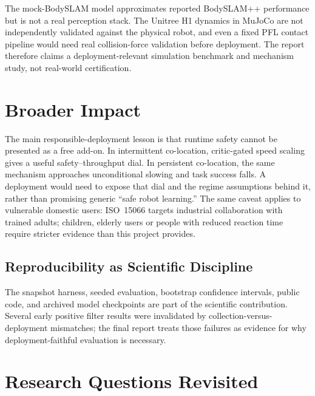 \documentclass[11pt,a4paper]{report}
\newcommand{\pfl}{PFL}
\newcommand{\iso}{ISO~15066}
\newcommand{\bodyslampp}{BodySLAM\nolinebreak[4]\hspace{-.05em}\raisebox{.2ex}{\scriptsize ++}}
\begin{document}
The mock-\bodyslampp{} model approximates reported BodySLAM++
performance but is not a real perception stack. The Unitree H1 dynamics
in MuJoCo are not independently validated against the physical robot,
and even a fixed \pfl{} contact pipeline would need real collision-force
validation before deployment. The report therefore claims a
deployment-relevant simulation benchmark and mechanism study, not
real-world certification.

\section{Broader Impact}
\label{sec:disc:broader}

The main responsible-deployment lesson is that runtime safety cannot be
presented as a free add-on. In intermittent co-location, critic-gated
speed scaling gives a useful safety--throughput dial. In persistent
co-location, the same mechanism approaches unconditional slowing and
task success falls. A deployment would need to expose that dial and the
regime assumptions behind it, rather than promising generic ``safe
robot learning.'' The same caveat applies to vulnerable domestic users:
\iso{} targets industrial collaboration with trained adults; children,
elderly users or people with reduced reaction time require stricter
evidence than this project provides.

\subsection{Reproducibility as Scientific Discipline}
\label{sec:disc:repro}

The snapshot harness, seeded evaluation, bootstrap confidence
intervals, public code, and archived model checkpoints are part of the
scientific contribution. Several early positive filter results were
invalidated by collection-versus-deployment mismatches; the final
report treats those failures as evidence for why deployment-faithful
evaluation is necessary.

\iffalse
\section{Research Questions Revisited}
\label{sec:disc:rqs-revisited}
\end{document}
